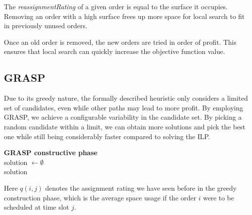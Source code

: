 \documentclass{article}
\begin{document}
The \textit{reassignmentRating} of a given order is equal to the surface it occupies. Removing an order with a high surface frees up more space for local search to fit in previously unused orders.

Once an old order is removed, the new orders are tried in order of profit. 
This ensures that local search can quickly increase the objective function value.

\subsection{GRASP}
Due to its greedy nature, the formally described heuristic only considers a limited set of candidates, even while other paths may lead to more profit. By employing GRASP, we achieve a configurable variability in the candidate set. By picking a random candidate within a limit, we can obtain more solutions and pick the best one while still being considerably faster compared to solving the ILP. 
\begin{center}
\begin{algorithm}[H]
\textbf{GRASP constructive phase} \\
solution $\gets \emptyset$ \\
\Return solution \\
\end{algorithm}
\end{center}

Here $q(i,j)$ denotes the assignment rating we have seen before in the greedy construction phase, which is the average space usage if the order $i$ were to be scheduled at time slot $j$.
\end{document}
